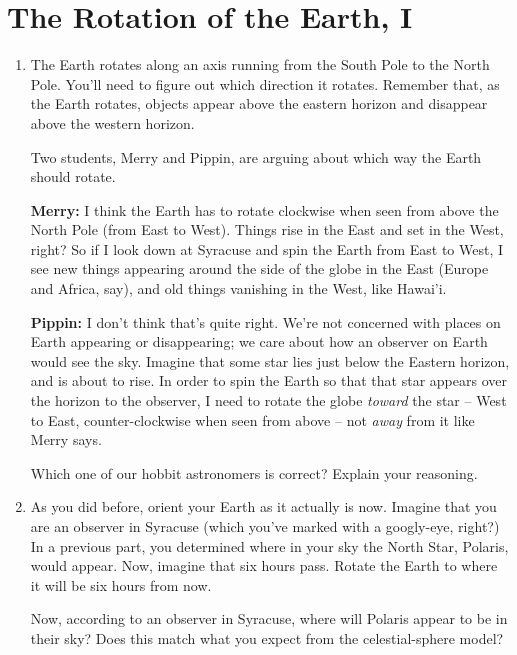 \documentclass[12pt]{article}
\begin{document}
\section{The Rotation of the Earth, I}

\begin{enumerate}
\item The Earth rotates along an axis running from the South Pole to the North Pole. You'll need to figure out which
direction it rotates. Remember that, as the Earth rotates, objects appear above the eastern horizon and disappear above the
western horizon.

Two students, Merry and Pippin, are arguing about which way the Earth should rotate.

{\bf Merry:} I think the Earth has to rotate clockwise when seen from above the North Pole (from East to West). Things rise in 
the East and set in the West, right? So if I look down at Syracuse and spin the Earth from East to West, I see new things 
appearing around the side of the globe in the East (Europe and Africa, say), and old things vanishing in the West, like Hawai'i.

{\bf Pippin:} I don't think that's quite right. We're not concerned with places on Earth appearing or disappearing; we care about how an observer on Earth would see the sky. Imagine that some star lies just below the Eastern horizon, and is about to rise. In order to spin the Earth so that that star appears over the horizon to the observer, I need to rotate the globe {\it toward} the star -- West to East, counter-clockwise when seen from above -- not {\it away} from it like Merry says.

Which one of our hobbit astronomers is correct? Explain your reasoning.

\vspace{1.5in}

\item As you did before, orient your Earth as it actually is now. 
Imagine that you are an observer in Syracuse (which you've marked with a googly-eye, right?) In a previous part, you determined where in your sky the North Star, Polaris, would appear. Now, imagine that six hours pass. Rotate the Earth to where it will be six hours from now.

Now, according to an observer in Syracuse, where will Polaris appear to be in their sky? Does this match what you expect from the celestial-sphere model?

\vspace{1in}


\end{enumerate}
\end{document}
